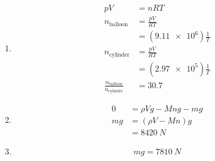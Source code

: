 \documentclass{article}
\begin{document}
\setcounter{subsubsection}{58}
\subsubsection{}

\begin{enumerate}
  \item

        \begin{align*}
          p V                                        & = n R T                      \\
          n_\text{balloon}                           & = \frac{p V}{R T}            \\
                                                     & = (\num{9.11e6}) \frac{1}{T} \\
          n_\text{cylinder}                          & = \frac{p V}{R T}            \\
                                                     & = (\num{2.97e5}) \frac{1}{T} \\
          \frac{n_\text{balloon}}{n_\text{cylinder}} & = 30.7
        \end{align*}

  \item

        \begin{align*}
          0   & = \rho V g - M n g - m g \\
          m g & = (\rho V - M n) g       \\
              & = \qty{8420}{N}
        \end{align*}

  \item \[m g = \qty{7810}{N}\]
\end{enumerate}

\setcounter{subsubsection}{66}
\subsubsection{}
\end{document}
